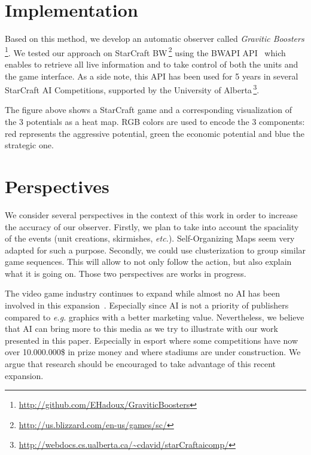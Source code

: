 \documentclass{jfsma}
\begin{document}
\section{Implementation}

Based on this method, we develop an automatic observer called \emph{Gravitic Boosters}\,\footnote{\url{http://github.com/EHadoux/GraviticBoosters}}.
We tested our approach on StarCraft BW\,\footnote{\url{http://us.blizzard.com/en-us/games/sc/}} using
the BWAPI API~\cite{bwapi} which enables to retrieve all live information and to take control of both the units and the game interface.
As a side note, this API has been used for 5 years in several StarCraft AI Competitions, supported by the University of Alberta\,\footnote{\url{http://webdocs.cs.ualberta.ca/~cdavid/starCraftaicomp/}}.

The figure above shows a StarCraft game and a corresponding visualization of the 3 potentials as a heat map.
RGB colors are used to encode the 3 components: red represents the aggressive potential, green the economic potential and blue the strategic one.

\section{Perspectives}
We consider several perspectives in the context of this work in order to increase the accuracy of our observer.
Firstly, we plan to take into account the spaciality of the events (unit creations, skirmishes, \emph{etc.}).
Self-Organizing Maps seem very adapted for such a purpose.
Secondly, we could use clusterization to group similar game sequences.
This will allow to not only follow the action, but also explain what it is going on.
Those two perspectives are works in progress.

The video game industry continues to expand while almost no AI has been involved in this expansion~\cite{miikkulainen2007creating}. Especially since AI is not a priority of publishers compared to \textit{e.g.} graphics with a better marketing value. Nevertheless, we believe that AI can bring more to this media as we try to illustrate with our work presented in this paper. Especially in esport where some competitions have now over 10.000.000\$ in prize money and where stadiums are under construction.
We argue that research should be encouraged to take advantage of this recent expansion.



\end{document}
